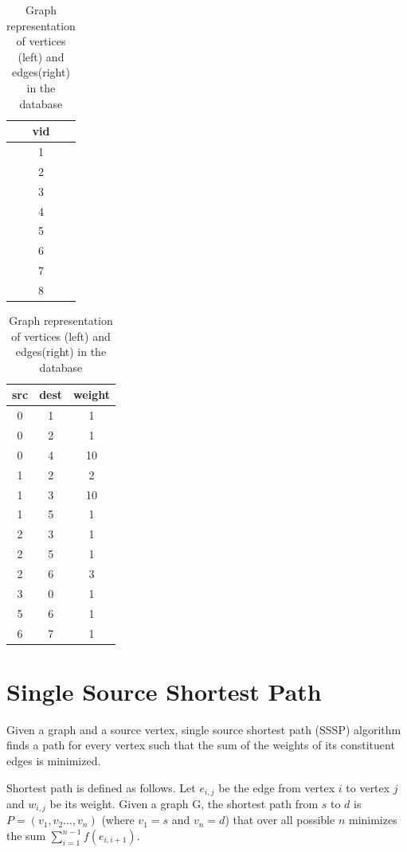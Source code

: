 \begin{table}
  \begin{tabular}{| c | }
    \hline
    vid \\ \hline
    1 \\ \hline
    2 \\ \hline
    3 \\ \hline
    4 \\ \hline
    5 \\ \hline
    6 \\ \hline
    7 \\ \hline
    8 \\
    \hline
  \end{tabular}
  \quad
  \begin{tabular}{| c | c | c |}
    \hline
    src & dest & weight \\ \hline
    0 & 1 & 1 \\ \hline
    0 & 2 & 1 \\ \hline
    0 & 4 & 10 \\ \hline
    1 & 2 & 2 \\ \hline
    1 & 3 & 10 \\ \hline
    1 & 5 & 1 \\ \hline
    2 & 3 & 1 \\ \hline
    2 & 5 & 1 \\ \hline
    2 & 6 & 3 \\ \hline
    3 & 0 & 1 \\ \hline
    5 & 6 & 1 \\ \hline
    6 & 7 & 1 \\
    \hline
  \end{tabular}
  \caption{Graph representation of vertices (left) and edges(right) in the database}
  \label{sssp:rep}
\end{table}


\section{Single Source Shortest Path} \label{sec:graph:sssp}

Given a graph and a source vertex, single source shortest path (SSSP) algorithm finds a path for every vertex such that the sum of the weights of its constituent edges is minimized.

Shortest path is defined as follows. Let $e_{i,j}$ be the edge from vertex $i$ to vertex $j$ and $w_{i,j}$ be its weight. Given a graph G, the shortest path from $s$ to $d$ is $P = (v_1, v_2 \dots, v_n)$ (where $v_1=s$ and $v_n=d$) that over all possible $n$ minimizes the sum $ \sum _{i=1}^{n-1}f(e_{i,i+1})$.

